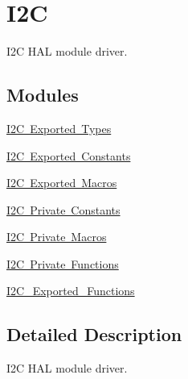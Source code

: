 \hypertarget{group___i2_c}{}\section{I2C}
\label{group___i2_c}


I2C H\+AL module driver.  


\subsection*{Modules}
\begin{DoxyCompactItemize}
\item 
\mbox{\hyperlink{group___i2_c___exported___types}{I2\+C Exported Types}}
\item 
\mbox{\hyperlink{group___i2_c___exported___constants}{I2\+C Exported Constants}}
\item 
\mbox{\hyperlink{group___i2_c___exported___macros}{I2\+C Exported Macros}}
\item 
\mbox{\hyperlink{group___i2_c___private___constants}{I2\+C Private Constants}}
\item 
\mbox{\hyperlink{group___i2_c___private___macros}{I2\+C Private Macros}}
\item 
\mbox{\hyperlink{group___i2_c___private___functions}{I2\+C Private Functions}}
\item 
\mbox{\hyperlink{group___i2_c___exported___functions}{I2\+C\+\_\+\+Exported\+\_\+\+Functions}}
\end{DoxyCompactItemize}


\subsection{Detailed Description}
I2C H\+AL module driver. 

